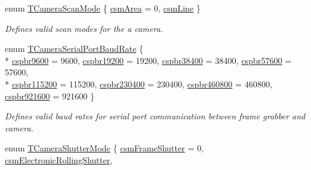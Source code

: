 \begin{DoxyCompactItemize}
enum \hyperlink{group___device_specific_interface_gaf4fc430c8da5f7825766e0a542f26801}{T\+Camera\+Scan\+Mode} \{ \hyperlink{group___device_specific_interface_ggaf4fc430c8da5f7825766e0a542f26801a30361b05f5130a2804387440e79e3e4a}{csm\+Area} = 0, 
\hyperlink{group___device_specific_interface_ggaf4fc430c8da5f7825766e0a542f26801a4932a01e794d7ab3bcf3a8d2d5780d4b}{csm\+Line}
 \}
\begin{DoxyCompactList}\small\item\em Defines valid scan modes for the a camera. \end{DoxyCompactList}\item 
enum \hyperlink{group___device_specific_interface_ga6b592e04a4f1db924eba76ff6cad77dc}{T\+Camera\+Serial\+Port\+Baud\+Rate} \{ \\*
\hyperlink{group___device_specific_interface_gga6b592e04a4f1db924eba76ff6cad77dca820641037eda0a7793e9237e13ab0e84}{cspbr9600} = 9600, 
\hyperlink{group___device_specific_interface_gga6b592e04a4f1db924eba76ff6cad77dca5895784dd5a7d70d12191c6b3a11faca}{cspbr19200} = 19200, 
\hyperlink{group___device_specific_interface_gga6b592e04a4f1db924eba76ff6cad77dcafaef1be50f84f7a163567a6783f77785}{cspbr38400} = 38400, 
\hyperlink{group___device_specific_interface_gga6b592e04a4f1db924eba76ff6cad77dcafba9d626ac911da83dc2c47b16e3cc36}{cspbr57600} = 57600, 
\\*
\hyperlink{group___device_specific_interface_gga6b592e04a4f1db924eba76ff6cad77dca209584aa3adeaa097b921414bab4c8ff}{cspbr115200} = 115200, 
\hyperlink{group___device_specific_interface_gga6b592e04a4f1db924eba76ff6cad77dca5e71501eb5dfe6cc51556c74e063ffa3}{cspbr230400} = 230400, 
\hyperlink{group___device_specific_interface_gga6b592e04a4f1db924eba76ff6cad77dca8f8d8ba9e218fb7c61035fbdf460c378}{cspbr460800} = 460800, 
\hyperlink{group___device_specific_interface_gga6b592e04a4f1db924eba76ff6cad77dcac8cd0c0398326d905381f34cc1fcab0f}{cspbr921600} = 921600
 \}
\begin{DoxyCompactList}\small\item\em Defines valid baud rates for serial port communication between frame grabber and camera. \end{DoxyCompactList}\item 
enum \hyperlink{group___device_specific_interface_ga20dd9ab797852e2e4b9a81bf8de2f2d6}{T\+Camera\+Shutter\+Mode} \{ \hyperlink{group___device_specific_interface_gga20dd9ab797852e2e4b9a81bf8de2f2d6aba2e59f11f0a120e7f4639df54c34907}{csm\+Frame\+Shutter} = 0, 
\hyperlink{group___device_specific_interface_gga20dd9ab797852e2e4b9a81bf8de2f2d6a9e106f1e0eb013e303c90d36d0287202}{csm\+Electronic\+Rolling\+Shutter}, 

\end{DoxyCompactItemize}
